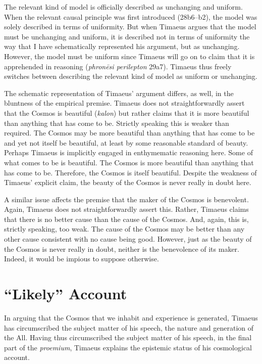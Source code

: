 The relevant kind of model is officially described as unchanging and uniform. When the relevant causal principle was first introduced (28b6--b2), the model was solely described in terms of uniformity. But when Timaeus argues that the model must be unchanging and uniform, it is described not in terms of uniformity the way that I have schematically represented his argument, but as unchanging. However, the model must be uniform since Timaeus will go on to claim that it is apprehended in reasoning (\emph{phronēsi perilepton} 29a7). Timaeus thus freely switches between describing the relevant kind of model as uniform or unchanging.

The schematic representation of Timaeus' argument differs, as well, in the bluntness of the empirical premise. Timaeus does not straightforwardly assert that the Cosmos is beautiful (\emph{kalon}) but rather claims that it is more beautiful than anything that has come to be. Strictly speaking this is weaker than required. The Cosmos may be more beautiful than anything that has come to be and yet not itself be beautiful, at least by some reasonable standard of beauty. Perhaps Timaeus is implicitly engaged in enthymematic reasoning here. Some of what comes to be is beautiful. The Cosmos is more beautiful than anything that has come to be. Therefore, the Cosmos is itself beautiful. Despite the weakness of Timaeus' explicit claim, the beauty of the Cosmos is never really in doubt here. 

A similar issue affects the premise that the maker of the Cosmos is benevolent. Again, Timaeus does not straightforwardly assert this. Rather, Timaeus claims that there is no better cause than the cause of the Cosmos. And, again, this is, strictly speaking, too weak. The cause of the Cosmos may be better than any other cause consistent with no cause being good. However, just as the beauty of the Cosmos is never really in doubt, neither is the benevolence of its maker. Indeed, it would be impious to suppose otherwise.


\section{``Likely'' Account} %
\label{sec:likely_account}

In arguing that the Cosmos that we inhabit and experience is generated, Timae\-us has circumscribed the subject matter of his speech, the nature and generation of the All. Having thus circumscribed the subject matter of his speech, in the final part of the \emph{proemium}, Timaeus explains the epistemic status of his cosmological account.

